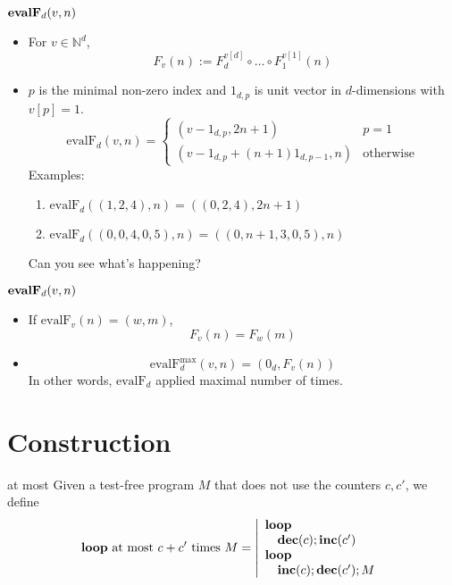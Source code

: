 \documentclass{beamer}
\renewcommand{\r}[1]{\text{\rmfamily{\textbf{#1}}}}
\newcommand{\inc}[0]{\text{\rmfamily{\textbf{inc}}}}
\newcommand{\dec}[0]{\text{\rmfamily{\textbf{dec}}}}
\newcommand{\lo}[0]{\text{\rmfamily{\textbf{loop}}}}
\newcommand{\loopam}[2]{\text{\rmfamily{\textbf{loop} at most $#1$ times $#2$}}}
\begin{document}
\begin{frame}{$\r{evalF}_d(v,n)$}
   \begin{itemize}
       \item For $v \in \mathbb{N}^d$,
       $$F_v(n) := F_d^{v[d]}\circ \dots \circ F_1^{v[1]}(n) $$

       \item $p$ is the minimal non-zero index and $1_{d,p}$ is unit vector in $d$-dimensions with $v[p] = 1$.
       $$\text{evalF}_d(v,n) = \begin{cases}
           (v - 1_{d,p}, 2n+1) & p = 1 \\
           (v - 1_{d,p} + (n+1)1_{d,p-1}, n) & \text{otherwise}
       \end{cases}$$
       Examples:
       \begin{enumerate}
           \item $\text{evalF}_d((1,2,4),n) = ((0,2,4),2n+1)$
           \item $\text{evalF}_d((0,0,4,0,5),n) = ((0,n+1,3,0,5),n)$
       \end{enumerate}
       Can you see what's happening?

   \end{itemize}
\end{frame}

\begin{frame}{$\r{evalF}_d(v,n)$}
   \begin{itemize}
       \item If $\text{evalF}_v(n) = (w,m)$,
       $$F_v(n) = F_w(m)$$

       \item $$\text{evalF}_d^\text{max}(v,n) = (0_d, F_v(n))$$
       In other words, $\text{evalF}_d$ applied maximal number of times.

   \end{itemize}
\end{frame}

\section{Construction}

\begin{frame}{\lo{} at most}
       Given a test-free program $M$ that does not use the counters $c,c'$, we define
       $$\loopam{c+c'}{M} = \left\vert \begin{array}{l}
            \lo \\
            \quad \dec(c);\inc(c') \\
            \lo \\
            \quad \inc(c);\dec(c');M
    \end{array} \right.$$
\end{frame}
\end{document}
